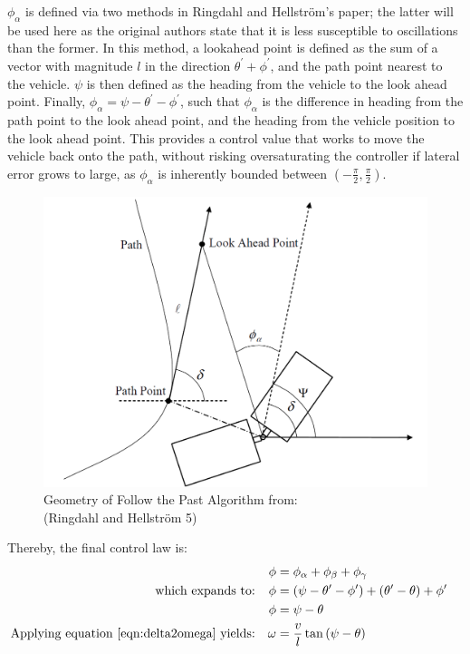 \documentclass[mla8alt]{mla}
\begin{document}
\begin{paper}
$\phi_\alpha$ is defined via two methods in Ringdahl and Hellström's paper; the latter will be used here as the original authors state that it is less susceptible to oscillations than the former. In this method, a lookahead point is defined as the sum of a vector with magnitude $l$ in the direction $\theta^\prime+\phi^\prime$, and the path point nearest to the vehicle. $\psi$ is then defined as the heading from the vehicle to the look ahead point. Finally, $\phi_\alpha=\psi-\theta^\prime-\phi^\prime$, such that $\phi_\alpha$ is the difference in heading from the path point to the look ahead point, and the heading from the vehicle position to the look ahead point. This provides a control value that works to move the vehicle back onto the path, without risking oversaturating the controller if lateral error grows to large, as $\phi_\alpha$ is inherently bounded between $(-\frac{\pi}{2},\frac{\pi}{2})$.

\begin{figure}[H]
\includegraphics[width=0.5\linewidth]{RingdahlFtPDiagram}
\captionsetup{justification=centering,margin=2cm}
\caption{Geometry of Follow the Past Algorithm from:\\(Ringdahl and Hellström 5)}
\label{img:ftp1}
\end{figure}

\newpage

Thereby, the final control law is:
\begin{subequations}
\begin{flalign}
&&\phi &= \phi_\alpha+\phi_\beta+\phi_\gamma &&\\
\text{which expands to:}
&&\phi &= (\psi-\theta^\prime-\phi^\prime) + (\theta^\prime-\theta) + \phi^\prime &&\\
&&\phi &= \psi-\theta &&\\
\text{Applying equation \ref{eqn:delta2omega} yields:}
&&\omega &= \frac{v}{l}\tan{(\psi-\theta)}&&
\end{flalign}
\end{subequations}



\end{paper}
\end{document}
